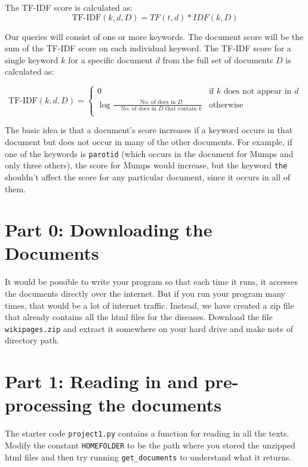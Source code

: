 \documentclass{assignment}
\begin{document}

The TF-IDF score is calculated as: 
\[ \text{TF-IDF}(k, d, D) = TF(t, d) * IDF(k, D)\]


Our queries will consist of one or more keywords. The document score will be the sum of the TF-IDF score
on each individual keyword. The TF-IDF score for a single keyword $k$ for a specific document $d$ from the 
full set of documents $D$  is calculated as:


\[ \text{TF-IDF}(k, d, D) =
  \begin{cases}
    0       & \text{if } k \text{ does not appear in } d \\
    \log \frac{ \quad \text{ No. of docs in } D }{ \quad \text{ No. of docs in } D \text{ that contain } k} & \text{otherwise}   \\
    \end{cases}
\]

The basic idea is that a document's score increases if a keyword occurs in that document but does not occur in many of the other documents.  For example, if one of the keywords is  \verb|parotid| (which occurs in the document for Mumps and only three others), the score for Mumps would increase, but the keyword \verb|the|
shouldn't affect the score for any particular document, since it occurs in all of them.


\section*{Part 0: Downloading the Documents}

It would be possible to write your program so that each time it runs, it accesses the documents directly over
the internet. But if you run your program many times, that would be a lot of internet traffic. Instead, we have created
a zip file that already contains all the html files for the diseases. 
Download the file \verb;wikipages.zip; and extract it somewhere on your hard drive and make note of directory path.

\section*{Part 1: Reading in and pre-processing the documents}
The starter code \verb|project1.py| contains a function for reading in all the texts. 
Modify the constant \verb;HOMEFOLDER; to be the path where you stored the unzipped html files 
and then try running \verb;get_documents; to understand what it returns.
\end{document}

